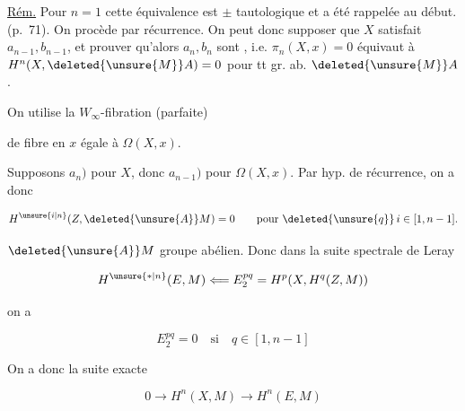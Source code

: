 \uline{Rém.} Pour $n=1$ cette équivalence est $\pm$ tautologique et a été rappelée  au début. (p.~71). On procède par récurrence. On peut donc supposer que  $X$ satisfait $a_{n-1},b_{n-1}$, et prouver qu'alors $a_n,b_n$ sont , i.e. $\pi_n(X,x)=0$ équivaut à $H^n(X,\deleted{\unsure{M}}A)=0$ pour tt gr. ab. $\deleted{\unsure{M}}A$.

On utilise la  $W_\infty$-fibration (parfaite)


de fibre  en $x$ égale à $\Omega(X,x)$.

Supposons $a_n)$ pour $X$, donc $a_{n-1})$ pour $\Omega(X,x)$. Par hyp. de récurrence, on a donc

\[
H^{\unsure{i|n}}(Z,\deleted{\unsure{A}}M)=0\qquad\text{pour }\deleted{\unsure{q}}\,i\in[1,n-1].
\]

$\deleted{\unsure{A}}M$  groupe abélien. Donc dans la suite spectrale de Leray

\[
H^{\unsure{*|n}}(E,M)\Longleftarrow E^{pq}_2=H^p(X,H^q(Z,M))
\]

on a

\[
E^{pq}_2=0\quad\text{si}\quad q\in[1,n-1]
\]


On a donc la suite exacte

\[
0\longrightarrow H^n(X,M)\longrightarrow H^n(E,M)
\]

